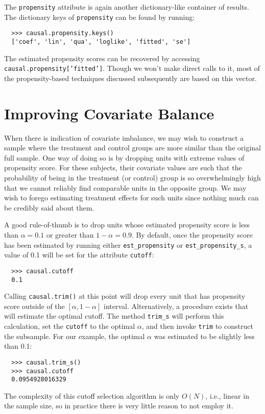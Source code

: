 \documentclass[12pt]{article}
\theoremstyle{definition}
\theoremstyle{definition}
\theoremstyle{definition}
\theoremstyle{remark}
\begin{document}
The \texttt{propensity} attribute is again another dictionary-like container of results. The dictionary keys of \texttt{propensity} can be found by running:
\begin{verbatim}
  >>> causal.propensity.keys()
  ['coef', 'lin', 'qua', 'loglike', 'fitted', 'se']
\end{verbatim}
The estimated propensity scores can be recovered by accessing \texttt{causal.propensity['fitted']}. Though we won't make direct calls to it, most of the propensity-based techniques discussed subsequently are based on this vector.


\section{Improving Covariate Balance} \label{sec.d}

When there is indication of covariate imbalance, we may wish to construct a sample where the treatment and control groups are more similar than the original full sample. One way of doing so is by dropping units with extreme values of propensity score. For these subjects, their covariate values are such that the probability of being in the treatment (or control) group is so overwhelmingly high that we cannot reliably find comparable units in the opposite group. We may wish to forego estimating treatment effects for such units since nothing much can be credibly said about them.

A good rule-of-thumb is to drop units whose estimated propensity score is less than $\alpha=0.1$ or greater than $1-\alpha=0.9$. By default, once the propensity score has been estimated by running either \texttt{est\_propensity} or \texttt{est\_propensity\_s}, a value of 0.1 will be set for the attribute \texttt{cutoff}:

\begin{verbatim}
  >>> causal.cutoff
  0.1
\end{verbatim}

Calling \texttt{causal.trim()} at this point will drop every unit that has propensity score outside of the $[\alpha, 1-\alpha]$ interval. Alternatively, a procedure exists that will estimate the optimal cutoff. The method \texttt{trim\_s} will perform this calculation, set the \texttt{cutoff} to the optimal $\alpha$, and then invoke \texttt{trim} to construct the subsample. For our example, the optimal $\alpha$ was estimated to be slightly less than 0.1:
\begin{verbatim}
  >>> causal.trim_s()
  >>> causal.cutoff
  0.0954928016329
\end{verbatim}
The complexity of this cutoff selection algorithm is only $O(N)$, i.e., linear in the sample size, so in practice there is very little reason to not employ it.
\end{document}
